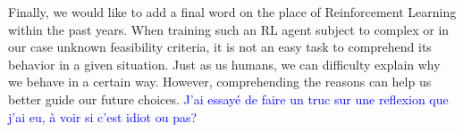 Finally, we would like to add a final word on the place of Reinforcement Learning within the past years.
When training such an RL agent subject to complex or in our case unknown feasibility criteria, it is not an easy task to comprehend its behavior in a given situation.
Just as us humans, we can difficulty explain why we behave in a certain way. However, comprehending the reasons can help us better guide our future choices.
\textcolor{blue}{J'ai essayé de faire un truc sur une reflexion que j'ai eu, à voir si c'est idiot ou pas?}
